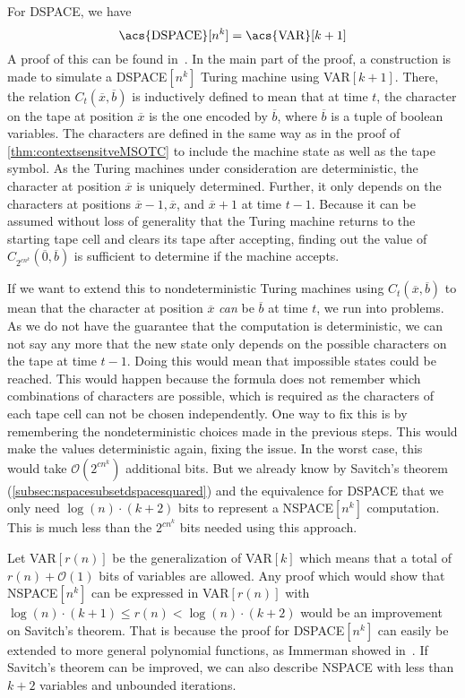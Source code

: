 For \acs{DSPACE}, we have
\[
    \text{\acs{DSPACE}}[n^k] = \text{\acs{VAR}}[k + 1]
\]
A proof of this can be found in~\cite{descriptive-complexity}.
In the main part of the proof, a construction is made to simulate a \acs{DSPACE}$[n^k]$ Turing machine using \acs{VAR}$[k + 1]$.
There, the relation $C_{t}(\overline{x}, \overline{b})$ is inductively defined to mean that at time $t$, the character on the tape at position $\overline{x}$ is the one encoded by $\overline{b}$, where $\overline{b}$ is a tuple of boolean variables.
The characters are defined in the same way as in the proof of \cref{thm:contextsensitveMSOTC} to include the machine state as well as the tape symbol.
As the Turing machines under consideration are deterministic, the character at position $\overline{x}$ is uniquely determined.
Further, it only depends on the characters at positions $\overline{x} - 1, \overline{x}$, and $\overline{x} + 1$ at time $t - 1$.
Because it can be assumed without loss of generality that the Turing machine returns to the starting tape cell and clears its tape after accepting, finding out the value of $C_{2^{cn^k}}(\overline{0}, \overline{b})$ is sufficient to determine if the machine accepts.

If we want to extend this to nondeterministic Turing machines using $C_{t}(\overline{x}, \overline{b})$ to mean that the character at position $\overline{x}$ \emph{can} be $\overline{b}$ at time $t$, we run into problems.
As we do not have the guarantee that the computation is deterministic, we can not say any more that the new state only depends on the possible characters on the tape at time $t - 1$.
Doing this would mean that impossible states could be reached.
This would happen because the formula does not remember which combinations of characters are possible, which is required as the characters of each tape cell can not be chosen independently.
One way to fix this is by remembering the nondeterministic choices made in the previous steps.
This would make the values deterministic again, fixing the issue.
In the worst case, this would take $\mathcal{O}(2^{cn^k})$ additional bits.
But we already know by Savitch's theorem (\cref{subsec:nspacesubsetdspacesquared}) and the equivalence for \acs{DSPACE} that we only need $\log(n) \cdot (k + 2)$ bits to represent a \acs{NSPACE}$[n^k]$ computation.
This is much less than the $2^{cn^k}$ bits needed using this approach.

Let \acs{VAR}$[r(n)]$ be the generalization of \acs{VAR}$[k]$ which means that a total of $r(n) + \mathcal{O}(1)$ bits of variables are allowed.
Any proof which would show that \acs{NSPACE}$[n^k]$ can be expressed in \acs{VAR}$[r(n)]$ with $\log(n) \cdot (k + 1) \leq r(n) < \log(n) \cdot (k + 2)$ would be an improvement on Savitch's theorem.
That is because the proof for \acs{DSPACE}$[n^k]$ can easily be extended to more general polynomial functions, as Immerman showed in~\cite{Immerman1999}.
If Savitch's theorem can be improved, we can also describe \acs{NSPACE} with less than $k + 2$ variables and unbounded iterations.


